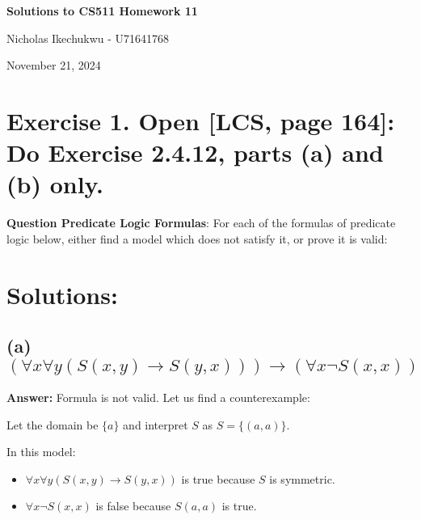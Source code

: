 \documentclass{article}
\begin{document}
\begin{center}
    \Large\textbf{Solutions to CS511 Homework 11}
    
    \vspace{0.5cm}
    
    \large Nicholas Ikechukwu - U71641768
    
    \vspace{0.3cm}
    
    \large November 21, 2024
\end{center}



\section*{Exercise 1. Open [LCS, page 164]: Do Exercise 2.4.12, parts (a) and (b) only.}



\begin{mdframed}
\vspace{1em}
    \textbf{Question Predicate Logic Formulas}: For each of the formulas of predicate logic below, either find a model which
    does not satisfy it, or prove it is valid:
\vspace{1em}
\end{mdframed}

\section*{Solutions: }

\subsection*{(a) $(\forall x \forall y (S(x, y) \rightarrow S(y, x))) \rightarrow (\forall x \neg S(x, x))$}

\vspace{1em}
\textbf{Answer:} Formula is not valid. Let us find a counterexample:

\vspace{1em}

Let the domain be $\{a\}$ and interpret $S$ as $S = \{(a,a)\}$.

\vspace{1em}

In this model:
\begin{itemize}
    \item $\forall x \forall y (S(x, y) \rightarrow S(y, x))$ is true because $S$ is symmetric.
    \item $\forall x \neg S(x, x)$ is false because $S(a,a)$ is true.
\end{itemize}
\end{document}
